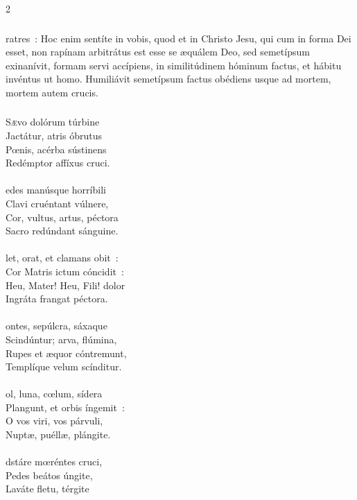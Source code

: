 \documentclass[9pt,twoside]{extarticle}
\begin{document}
\begin{multicols}{2}
{\subsubsection*{}
ratres~: Hoc enim sentíte in vobis, quod et in Christo Jesu, qui cum in forma Dei esset, non rapínam arbitrátus est esse se æquálem Deo, sed semetípsum exinanívit, formam servi accípiens, in similitúdinem hóminum factus, et hábitu invéntus ut homo. Humiliávit semetípsum factus obédiens usque ad mortem, mortem autem crucis.

\subsubsection*{\center {}}
\lettrine{S}ævo dolórum túrbine\\
Jactátur, atris óbrutus\\
Pœnis, acérba sústinens\\
Redémptor affíxus cruci.\\
\\
edes manúsque horríbili\\
Clavi cruéntant vúlnere,\\
Cor, vultus, artus, péctora\\
Sacro redúndant sánguine.\\
\\
let, orat, et clamans obit~:\\
Cor Matris ictum cóncidit~:\\
Heu, Mater! Heu, Fili! dolor\\
Ingráta frangat péctora.\\
\\
ontes, sepúlcra, sáxaque\\
Scindúntur; arva, flúmina,\\
Rupes et æquor cóntremunt,\\
Templíque velum scínditur.\\
\\
ol, luna, cœlum, sídera\\
Plangunt, et orbis íngemit~:\\
O vos viri, vos párvuli,\\
Nuptæ, puéllæ, plángite.\\
\\
dstáre mœréntes cruci,\\
Pedes beátos úngite,\\
Laváte fletu, térgite\\
}
\end{multicols}
\end{document}
